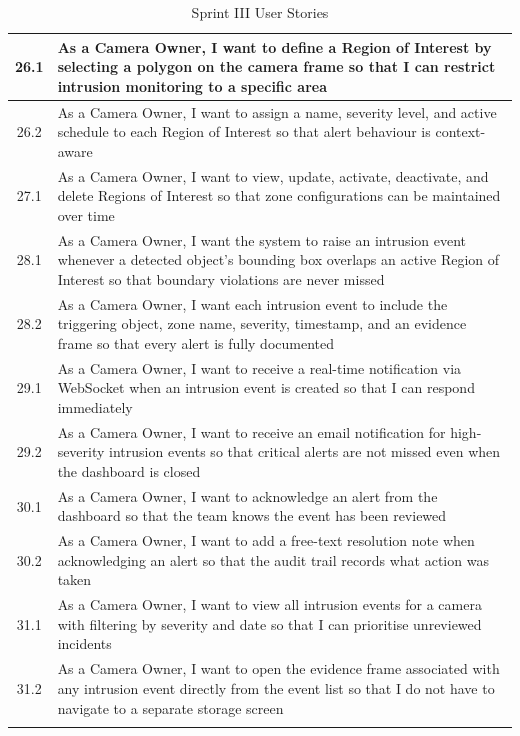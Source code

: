\begin{longtable}{|>{\small}c|>{\small\raggedright\arraybackslash}p{11.5cm}|}
26.1 & As a Camera Owner, I want to define a Region of Interest by selecting a polygon on the camera frame so that I can restrict intrusion monitoring to a specific area \\ \hline
26.2 & As a Camera Owner, I want to assign a name, severity level, and active schedule to each Region of Interest so that alert behaviour is context-aware \\ \hline
27.1 & As a Camera Owner, I want to view, update, activate, deactivate, and delete Regions of Interest so that zone configurations can be maintained over time \\ \hline
28.1 & As a Camera Owner, I want the system to raise an intrusion event whenever a detected object's bounding box overlaps an active Region of Interest so that boundary violations are never missed \\ \hline
28.2 & As a Camera Owner, I want each intrusion event to include the triggering object, zone name, severity, timestamp, and an evidence frame so that every alert is fully documented \\ \hline
29.1 & As a Camera Owner, I want to receive a real-time notification via WebSocket when an intrusion event is created so that I can respond immediately \\ \hline
29.2 & As a Camera Owner, I want to receive an email notification for high-severity intrusion events so that critical alerts are not missed even when the dashboard is closed \\ \hline
30.1 & As a Camera Owner, I want to acknowledge an alert from the dashboard so that the team knows the event has been reviewed \\ \hline
30.2 & As a Camera Owner, I want to add a free-text resolution note when acknowledging an alert so that the audit trail records what action was taken \\ \hline
31.1 & As a Camera Owner, I want to view all intrusion events for a camera with filtering by severity and date so that I can prioritise unreviewed incidents \\ \hline
31.2 & As a Camera Owner, I want to open the evidence frame associated with any intrusion event directly from the event list so that I do not have to navigate to a separate storage screen \\ \hline

\caption{Sprint III User Stories}
\label{tab:sprint3_stories}
\end{longtable}

